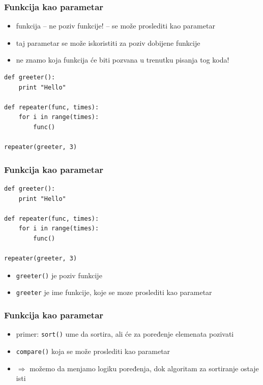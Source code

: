 \documentclass[compress]{beamer}
\begin{document}
\begin{frame}[fragile]
  \frametitle{Funkcija kao parametar}
  \begin{itemize}
    \item funkcija -- ne poziv funkcije! -- se može proslediti kao parametar
    \item taj parametar se može iskoristiti za poziv dobijene funkcije
    \item ne znamo koja funkcija će biti pozvana u trenutku pisanja tog koda!
  \end{itemize}
\begin{verbatim}
def greeter():
    print "Hello"

def repeater(func, times):
    for i in range(times):
        func()

repeater(greeter, 3)
\end{verbatim}
\end{frame}

\begin{frame}[fragile]
  \frametitle{Funkcija kao parametar}
\begin{verbatim}
def greeter():
    print "Hello"

def repeater(func, times):
    for i in range(times):
        func()

repeater(greeter, 3)
\end{verbatim}
  \begin{itemize}
    \item \texttt{greeter()} je poziv funkcije
    \item \texttt{greeter} je ime funkcije, koje se moze proslediti kao parametar
  \end{itemize}
\end{frame}

\begin{frame}[fragile]
  \frametitle{Funkcija kao parametar}
  \begin{itemize}
    \item primer: \texttt{sort()} ume da sortira, ali će za poređenje elemenata pozivati
    \item \texttt{compare()} koja se može proslediti kao parametar
    \item $\Rightarrow$ možemo da menjamo logiku poređenja, dok algoritam za sortiranje ostaje isti
  \end{itemize}
\end{frame}
\end{document}
